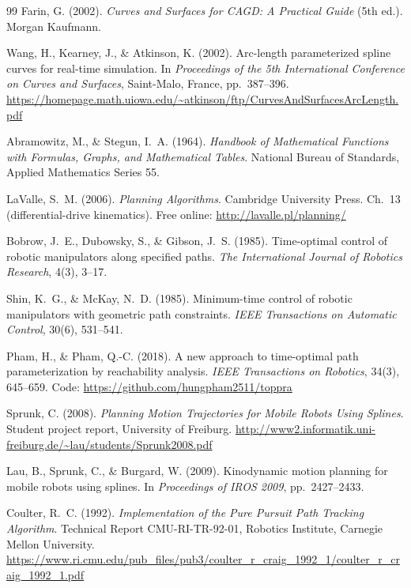 \documentclass[11pt]{article}
\begin{document}
\newpage
\begin{thebibliography}{99}
Farin, G. (2002). \emph{Curves and Surfaces for CAGD: A Practical Guide} (5th ed.). Morgan Kaufmann.

Wang, H., Kearney, J., \& Atkinson, K. (2002). Arc-length parameterized spline curves for real-time simulation. In \emph{Proceedings of the 5th International Conference on Curves and Surfaces}, Saint-Malo, France, pp.~387--396. \url{https://homepage.math.uiowa.edu/~atkinson/ftp/CurvesAndSurfacesArcLength.pdf}

Abramowitz, M., \& Stegun, I.~A. (1964). \emph{Handbook of Mathematical Functions with Formulas, Graphs, and Mathematical Tables}. National Bureau of Standards, Applied Mathematics Series 55.

LaValle, S.~M. (2006). \emph{Planning Algorithms}. Cambridge University Press. Ch.~13 (differential-drive kinematics). Free online: \url{http://lavalle.pl/planning/}

Bobrow, J.~E., Dubowsky, S., \& Gibson, J.~S. (1985). Time-optimal control of robotic manipulators along specified paths. \emph{The International Journal of Robotics Research}, 4(3), 3--17.

Shin, K.~G., \& McKay, N.~D. (1985). Minimum-time control of robotic manipulators with geometric path constraints. \emph{IEEE Transactions on Automatic Control}, 30(6), 531--541.

Pham, H., \& Pham, Q.-C. (2018). A new approach to time-optimal path parameterization by reachability analysis. \emph{IEEE Transactions on Robotics}, 34(3), 645--659. Code: \url{https://github.com/hungpham2511/toppra}

Sprunk, C. (2008). \emph{Planning Motion Trajectories for Mobile Robots Using Splines}. Student project report, University of Freiburg. \url{http://www2.informatik.uni-freiburg.de/~lau/students/Sprunk2008.pdf}

Lau, B., Sprunk, C., \& Burgard, W. (2009). Kinodynamic motion planning for mobile robots using splines. In \emph{Proceedings of IROS 2009}, pp.~2427--2433.

Coulter, R.~C. (1992). \emph{Implementation of the Pure Pursuit Path Tracking Algorithm}. Technical Report CMU-RI-TR-92-01, Robotics Institute, Carnegie Mellon University. \url{https://www.ri.cmu.edu/pub_files/pub3/coulter_r_craig_1992_1/coulter_r_craig_1992_1.pdf}


\end{thebibliography}
\end{document}
